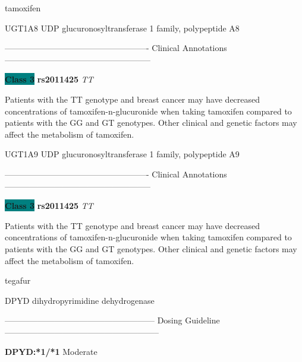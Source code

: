 \documentclass{resume} %
\begin{document}
\begin{rSection}{ tamoxifen }
\begin{rSubsection}{ UGT1A8 }{ UDP glucuronosyltransferase 1 family, polypeptide A8 }{}{}
\item[] ---------------------------------------------------- Clinical Annotations -----------------------------------------------------\newline
\item \textbf{\colorbox{teal} {Class 3}} \textbf{ rs2011425 } \textit{ TT }
\item[] Patients with the TT genotype and breast cancer may have decreased concentrations of tamoxifen-n-glucuronide when taking tamoxifen compared to patients with the GG and GT genotypes. Other clinical and genetic factors may affect the metabolism of tamoxifen.
\end{rSubsection}\begin{rSubsection}{ UGT1A9 }{ UDP glucuronosyltransferase 1 family, polypeptide A9 }{}{}
\item[]

\item[] ---------------------------------------------------- Clinical Annotations -----------------------------------------------------\newline
\item \textbf{\colorbox{teal} {Class 3}} \textbf{ rs2011425 } \textit{ TT }
\item[] Patients with the TT genotype and breast cancer may have decreased concentrations of tamoxifen-n-glucuronide when taking tamoxifen compared to patients with the GG and GT genotypes. Other clinical and genetic factors may affect the metabolism of tamoxifen.
\end{rSubsection}

\end{rSection}\begin{rSection}{ tegafur }
\item[]

\begin{rSubsection}{ DPYD }{ dihydropyrimidine dehydrogenase }{}{}
\item[]
\item[] ------------------------------------------------------ Dosing Guideline --------------------------------------------------------\newline
\item[]
\item[] \textbf{ DPYD:*1/*1 } Moderate


\end{rSubsection}
\end{rSection}
\end{document}
